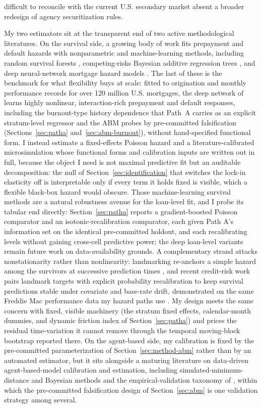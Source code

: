 \documentclass[12pt]{article}
\begin{document}
difficult to reconcile with the current U.S. secondary market absent a broader redesign of agency securitization rules.

My two estimators sit at the transparent end of two active methodological literatures. On the survival side, a growing body of work fits prepayment and default hazards with nonparametric and machine-learning methods, including random survival forests \citep{ishwaran2008}, competing-risks Bayesian additive regression trees \citep{sparapani2020}, and deep neural-network mortgage hazard models \citep{sadhwani2021}. The last of these is the benchmark for what flexibility buys at scale: fitted to origination and monthly performance records for over 120 million U.S. mortgages, the deep network of \citet{sadhwani2021} learns highly nonlinear, interaction-rich prepayment and default responses, including the burnout-type history dependence that Path~A carries as an explicit stratum-level regressor and the ABM probes by pre-committed falsification (Sections~\ref{sec:patha} and~\ref{sec:abm-burnout}), without hand-specified functional form. I instead estimate a fixed-effects Poisson hazard and a literature-calibrated microsimulation whose functional forms and calibration inputs are written out in full, because the object I need is not maximal predictive fit but an auditable decomposition: the null of Section~\ref{sec:identification} that switches the lock-in elasticity off is interpretable only if every term it holds fixed is visible, which a flexible black-box hazard would obscure. Those machine-learning survival methods are a natural robustness avenue for the loan-level fit, and I probe its tabular end directly: Section~\ref{sec:patha} reports a gradient-boosted Poisson comparator and an isotonic-recalibration comparator, each given Path A's information set on the identical pre-committed holdout, and each recalibrating levels without gaining cross-cell predictive power; the deep loan-level variants remain future work on data-availability grounds. A complementary strand attacks nonstationarity rather than nonlinearity: landmarking re-anchors a simple hazard among the survivors at successive prediction times \citep{vanhouwelingen2007,putter2022}, and recent credit-risk work pairs landmark targets with explicit probability recalibration to keep survival predictions stable under covariate and base-rate drift, demonstrated on the same Freddie Mac performance data my hazard paths use \citep{peng2026}. My design meets the same concern with fixed, visible machinery (the stratum fixed effects, calendar-month dummies, and dynamic friction index of Section~\ref{sec:patha}) and prices the residual time-variation it cannot remove through the temporal moving-block bootstrap reported there. On the agent-based side, my calibration is fixed by the pre-committed parameterization of Section~\ref{sec:method-abm} rather than by an automated estimator, but it sits alongside a maturing literature on data-driven agent-based-model calibration and estimation, including simulated-minimum-distance and Bayesian methods \citep{grazzini2017,platt2020} and the empirical-validation taxonomy of \citet{fagiolo2007}, within which the pre-committed falsification design of Section~\ref{sec:abm} is one validation strategy among several.
\end{document}
